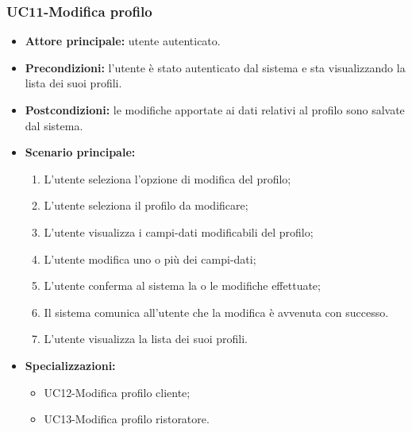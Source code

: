 \subsubsection{UC11-Modifica profilo }
\begin{itemize}
\item \textbf{Attore principale:} utente autenticato.
\item \textbf{Precondizioni:} l'utente è stato autenticato dal sistema e sta visualizzando la lista dei suoi profili.
\item \textbf{Postcondizioni:} le modifiche apportate ai dati relativi al profilo sono salvate dal sistema.
\item \textbf{Scenario principale:}
\begin{enumerate}
    \item L'utente seleziona l'opzione di modifica del profilo;
    \item L'utente seleziona il profilo da modificare;
    \item L'utente visualizza i campi-dati modificabili del profilo;
    \item L'utente modifica uno o più dei campi-dati;
    \item L'utente conferma al sistema la o le modifiche effettuate;
    \item Il sistema comunica all'utente che la modifica è avvenuta con successo.
    \item L'utente visualizza la lista dei suoi profili.
\end{enumerate}
    \item \textbf{Specializzazioni:}
        \begin{itemize}
            \item UC12-Modifica profilo cliente;
            \item UC13-Modifica profilo ristoratore.
        \end{itemize}
\end{itemize}

